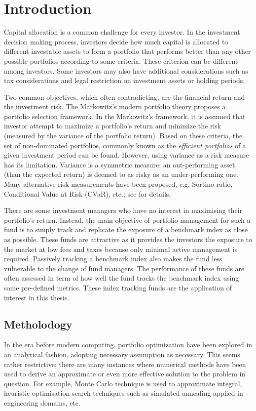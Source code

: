 \chapter{Introduction}
\graphicspath{{Chapter1/figures/}}
\label{Introduction}
Capital allocation is a common challenge for every investor. In the investment decision making process, investors decide how much capital is allocated to different investable assets to form a portfolio that performs better than any other possible portfolios according to some criteria. These criterion can be different among investors. Some investors may also have additional considerations such as tax considerations and legal restriction on investment assets or holding periods.

Two common objectives, which often contradicting, are the financial return and the investment risk. The Markowitz's modern portfolio theory \cite{HM52} proposes a portfolio selection framework. In the Markowitz's framework, it is assumed that investor attempt to maximize a portfolio's return and minimize the risk (measured by the variance of the portfolio return). Based on these criteria, the set of non-dominated portfolios, commonly known as the \emph{efficient portfolios} of a given investment period can be found. However, using variance as a risk measure has its limitation. Variance is a symmetric measure; an out-performing asset (than the expected return) is deemed to as risky as an under-performing one. Many alternative risk measurements have been proposed, e.g. Sortino ratio, Conditional Value at Risk (CVaR), etc.; see \cite{RTR00} for details.

There are some investment managers who have no interest in maximising their portfolio's return. Instead, the main objective of portfolio management for such a fund is to simply track and replicate the exposure of a benchmark index as close as possible. These funds are attractive as it provides the investors the exposure to the market at low fees and taxes because only minimal active management is required. Passively tracking a benchmark index also makes the fund less vulnerable to the change of fund managers. The performance of these funds are often assessed in term of how well the fund tracks the benchmark index using some pre-defined metrics. These index tracking funds are the application of interest in this thesis.

\section{Metholodogy}
In the era before modern computing, portfolio optimization have been explored in an analytical fashion, adopting necessary assumption as necessary. This seems rather restrictive; there are many instances where numerical methods have been used to derive an approximate or even more effective solution to the problem in question. For example, Monte Carlo technique is used to approximate integral, heuristic optimisation search techniques such as simulated annealing applied in engineering domains, etc.


